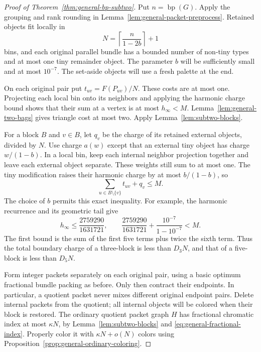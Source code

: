 \documentclass[11pt]{article}
\theoremstyle{definition}\newtheorem{algorithm}{Algorithm}[section]
\numberwithin{equation}{section}
\theoremstyle{remark}\newtheorem*{remark}{Remark}
\newcommand{\bp}{\operatorname{bp}}
\begin{document}
\begin{proof}[Proof of Theorem~\ref{thm:general-bp-subtwo}]
Put $n=\bp(G)$. Apply the grouping and rank rounding in
Lemma~\ref{lem:general-packet-preprocess}. Retained objects
fit locally in
\[
 N=\left\lceil\frac{n}{1-2b}\right\rceil+1
\]
bins, and each original parallel bundle has a bounded number of
non-tiny types and at most one tiny remainder object. The parameter
$b$ will be sufficiently small and at most $10^{-7}$.
The set-aside objects will use a fresh palette at the end.

On each original pair put $t_{uv}=F(P_{uv})/N$. These costs are at
most one. Projecting each local bin onto its neighbors and applying
the harmonic charge bound shows that their sum at a vertex is at
most $h_\infty<M$. Lemma~\ref{lem:general-two-bags} gives triangle
cost at most two. Apply Lemma~\ref{lem:subtwo-blocks}.

For a block $B$ and $v\in B$, let $q_v$ be the charge of its retained
external objects, divided by $N$. Use charge $a(w)$ except that
an external tiny object has charge $w/(1-b)$. In a local bin,
keep each internal neighbor projection together and leave each
external object separate. These weights still sum to at most one.
The tiny modification raises their harmonic charge by at most
$b/(1-b)$, so
\begin{equation}\label{eq:subtwo-local-charge}
 \sum_{u\in B\setminus\{v\}}t_{uv}+q_v\le M.
\end{equation}
The choice of $b$ permits this exact inequality. For example, the
harmonic recurrence and its geometric tail give
\[
 h_\infty\le\frac{2759290}{1631721},\qquad
 \frac{2759290}{1631721}+\frac{10^{-7}}{1-10^{-7}}<M.
\]
The first bound is the sum of the first five terms plus twice the
sixth term. Thus the total boundary charge of a three-block is
less than $D_3N$, and that of a five-block is less than $D_5N$.

Form integer packets separately on each original pair, using a
basic optimum fractional bundle packing as before. Only then
contract their endpoints. In particular, a quotient packet never
mixes different original endpoint pairs. Delete internal packets
from the quotient; all internal objects will be colored when their
block is restored. The ordinary quotient packet graph $H$ has
fractional chromatic index at most $\kappa N$, by
Lemma~\ref{lem:subtwo-blocks} and
\eqref{eq:general-fractional-index}. Properly color it with
$\kappa N+o(N)$ colors using
Proposition~\ref{prop:general-ordinary-coloring}.


\end{proof}
\end{document}

